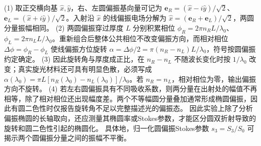 (1) 取正交横向基 \(\hat x,\hat y\)，右、左圆偏振基向量可记为 \(\mathbf e_R=(\hat x-i\hat y)/\sqrt2\)、\(\mathbf e_L=(\hat x+i\hat y)/\sqrt2\)。入射沿 \(\hat x\) 的线偏振电场分解为 \(\hat x=(\mathbf e_R+\mathbf e_L)/\sqrt2\)，两圆分量振幅相同。
(2) 两圆偏振穿过厚度 \(L\) 分别积累相位 \(\phi_R=2\pi n_RL/\lambda_0\)、\(\phi_L=2\pi n_LL/\lambda_0\)。重新组合后整体公共相位不改变偏振方向，而相对相位 \(\Delta\phi=\phi_R-\phi_L\) 使线偏振方位旋转 \(\alpha=\Delta\phi/2=\pi(n_R-n_L)L/\lambda_0\)，符号按圆偏振约定确定。
(3) 因此旋转角与厚度成正比，在 \(n_R-n_L\) 不随波长变化时按 \(1/\lambda_0\) 改变；真实旋光材料还可具有明显色散，必须写成 \(\alpha(\lambda_0)=\pi L[n_R(\lambda_0)-n_L(\lambda_0)]/\lambda_0\)。若 \(n_R=n_L\)，相对相位为零，输出偏振方向不旋转。
(4) 若左右圆偏振具有不同吸收系数，则两分量在出射处的幅值不再相等，除了相对相位还出现幅度差。两个不等幅圆分量叠加通常形成椭圆偏振，因此有圆二色性时仅报告旋转角不足以完整描述光的偏振态。 因此实验上除了分析偏振椭圆的长轴取向，还应测量其椭圆率或Stokes参数，才能区分圆双折射导致的旋转和圆二色性引起的椭圆化。 具体地，归一化圆偏振Stokes参数 \(s_3=S_3/S_0\) 可揭示两个圆偏振分量之间的振幅不平衡。

